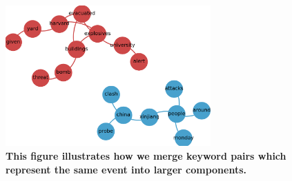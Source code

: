 \begin{figure}
  \begin{center}
    \includegraphics[width=0.7\textwidth]{figures_supp/Pictures_and_Drawings/connected_components}
    \caption{\textbf{This figure illustrates how we merge keyword
        pairs which represent the same event into larger components.
      }}
    \label{fig:connected_components}
  \end{center}
\end{figure}

